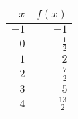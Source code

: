 \begin{tabular}{rr} \toprule
$x$  & $f(x)$         \\\midrule
$-1$ & $-1$           \\[6pt]
$0$  & $\frac{1}{2}$  \\[6pt]
$1$  & $2$            \\[6pt]
$2$  & $\frac{7}{2}$  \\[6pt]
$3$  & $5$            \\[6pt]
$4$  & $\frac{13}{2}$ \\\bottomrule
\end{tabular}
